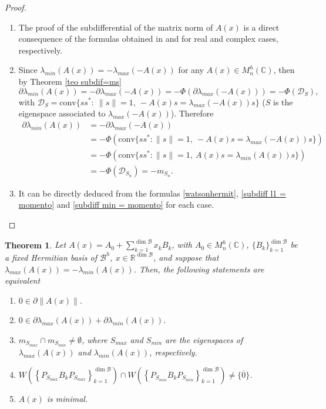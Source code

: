 \documentclass[12pt,a4paper]{article}
\def\calB{\mathcal B}
\def\R{\mathbb R}
\def\C{\mathbb C}
\newtheorem{theorem}{Theorem}
\numberwithin{equation}{section}
\begin{document}
\begin{proof}
	
\begin{enumerate}
	\item The proof of the subdifferential of the matrix norm of $A(x)$ is a direct consequence of the formulas obtained in \cite{watson} and \cite{bata-grover} for real  and complex cases, respectively.
	\item 	Since $\lambda_{min}(A(x))=-\lambda_{max}(-A(x))$ for any $A(x)\in M_n^{h}(\C)$, then by Theorem \ref{teo subdif=ms}
	\[\partial \lambda_{min}(A(x))=-\partial \lambda_{max}(-A(x))= -\Phi\left(\partial \lambda_{max}(-A(x)) \right)=-\Phi\left(\mathcal{D}_{S} \right) , \]
	with $\mathcal{D}_{S}=\text{conv}\{ss^*:\ \|s\|=1,\ -A(x)s=\lambda_{max}(-A(x))s\}$ ($S$ is the eigenspace associated to $\lambda_{max}(-A(x))$). Therefore
	\begin{equation*}
		\begin{split}
			\partial \lambda_{min}(A(x))&=-\partial \lambda_{max}(-A(x))\\
			&=-\Phi\left(\text{conv} \{ss^*: \|s\|=1,\ -A(x)s=\lambda_{max}(-A(x))s\} \right) \\
			&=-\Phi\left(\text{conv} \{ss^*: \|s\|=1,\ A(x)s=\lambda_{min}(A(x))s\} \right) \\
			&=-\Phi(\mathcal{D}_{S_n})=-m_{S_n}.
		\end{split}
	\end{equation*}
	
	\item It can be directly deduced from the formulas \eqref{watsonhermit}, \eqref{subdiff l1 = momento} and \eqref{subdiff min = momento} for each case.
\end{enumerate}

	
\end{proof}

\begin{theorem}\label{teo equiv subdif, momentos, etc para matrices}
	Let $A(x)=A_0+\sum_{k=1}^{\dim{\calB}}x_kB_k$, with $A_0\in  M_n^{h}(\C)$, $\{B_k\}_{k=1}^{\dim{\calB}}$ be a fixed Hermitian basis of $\mathcal{B}^h$, $x\in \R^{\dim{\calB}}$, and suppose that $\lambda_{max}(A(x))=-\lambda_{min}(A(x))$. Then, the following statements are equivalent
	
	\begin{enumerate}
		\item[(1)] $0\in \partial\|A(x)\|$.
		\item[(2)] $0\in\partial\lambda_{max}(A(x))+\partial\lambda_{min}(A(x))$.
		\item[(3)] $m_{S_{max}}\cap m_{S_{min}}\neq \emptyset$, where $S_{max}$ and $S_{min}$ are the eigenspaces of $\lambda_{max}(A(x))$ and $\lambda_{min}(A(x))$, respectively. 
		\item[(4)] $W\left( \left\lbrace P_{S_{max}}B_kP_{S_{max}}\right\rbrace_{k=1}^{\dim{\calB}} \right)\cap W\left( \left\lbrace P_{S_{min}}B_kP_{S_{min}}\right\rbrace_{k=1}^{\dim{\calB}} \right)\neq \{\overline{0}\} $. 
		\item[(5)] $A(x)$ is minimal.
	\end{enumerate}
\end{theorem}
\end{document}
